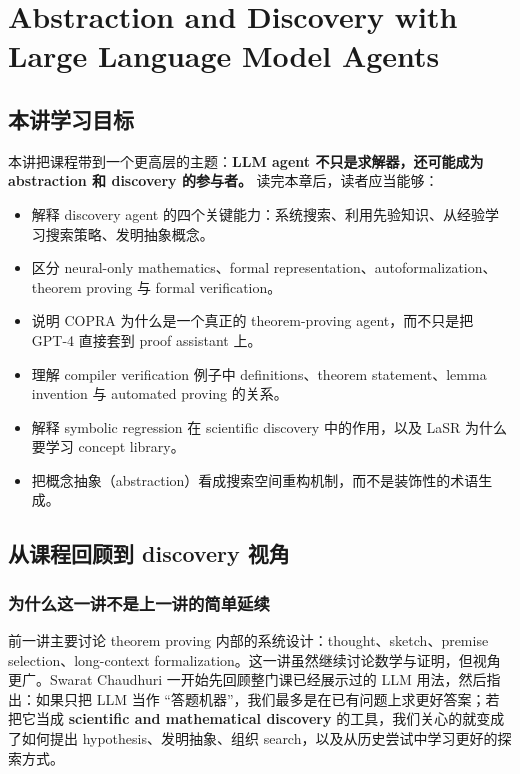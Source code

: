 \chapter{Abstraction and Discovery with Large Language Model Agents}
\label{chap:lec11_abstraction_discovery_llm_agents}
\section{本讲学习目标}

本讲把课程带到一个更高层的主题：\textbf{LLM agent 不只是求解器，还可能成为 abstraction 和 discovery 的参与者。} 读完本章后，读者应当能够：
\begin{itemize}
\item 解释 discovery agent 的四个关键能力：系统搜索、利用先验知识、从经验学习搜索策略、发明抽象概念。
\item 区分 neural-only mathematics、formal representation、autoformalization、theorem proving 与 formal verification。
\item 说明 COPRA 为什么是一个真正的 theorem-proving agent，而不只是把 GPT-4 直接套到 proof assistant 上。
\item 理解 compiler verification 例子中 definitions、theorem statement、lemma invention 与 automated proving 的关系。
\item 解释 symbolic regression 在 scientific discovery 中的作用，以及 LaSR 为什么要学习 concept library。
\item 把概念抽象（abstraction）看成搜索空间重构机制，而不是装饰性的术语生成。
\end{itemize}

\section{从课程回顾到 discovery 视角}

\subsection{为什么这一讲不是上一讲的简单延续}

前一讲主要讨论 theorem proving 内部的系统设计：thought、sketch、premise selection、long-context formalization。这一讲虽然继续讨论数学与证明，但视角更广。Swarat Chaudhuri 一开始先回顾整门课已经展示过的 LLM 用法，然后指出：如果只把 LLM 当作 ``答题机器''，我们最多是在已有问题上求更好答案；若把它当成 \textbf{scientific and mathematical discovery} 的工具，我们关心的就变成了如何提出 hypothesis、发明抽象、组织 search，以及从历史尝试中学习更好的探索方式。


